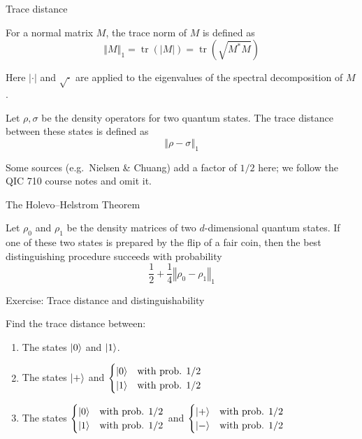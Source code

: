 \documentclass[10pt,aspectratio=169]{beamer}
\newcommand{\abs}[1]{\left| #1 \right|}
\newcommand{\norm}[1]{\left\Vert #1 \right\Vert}
\newcommand{\tr}{\operatorname{tr}}
\begin{document}
\begin{frame}{Trace distance}
  \begin{definition}
    For a normal matrix $M$, the trace norm of $M$ is defined as
    \[\norm{M}_1 = \tr\left(\abs{M}\right) = \tr\left(\sqrt{M^*M}\right)\]
  \end{definition}
  {\small Here $\abs{\cdot}$ and $\sqrt{\cdot}$ are applied to the eigenvalues
  of the spectral decomposition of $M$.\par}
  \vspace{0.5em}
  \pause
  \begin{definition}
    Let $\rho,\sigma$ be the density operators for two quantum states. The
    trace distance between these states is defined as
    \[\norm{\rho-\sigma}_1\]
  \end{definition}
  {\small Some sources (e.g.\ Nielsen \& Chuang) add a factor of $1/2$ here; we
  follow the QIC 710 course notes and omit it.\par}
\end{frame}

\begin{frame}{The Holevo--Helstrom Theorem}
  \begin{theorem}
    Let $\rho_0$ and $\rho_1$ be the density matrices of two $d$-dimensional
    quantum states. If one of these two states is prepared by the flip of a
    fair coin, then the best distinguishing procedure succeeds with probability
    \[\frac{1}{2} + \frac{1}{4}\norm{\rho_0 - \rho_1}_1\]
  \end{theorem}
\end{frame}

\begin{frame}{Exercise: Trace distance and distinguishability}
  \begin{exampleblock}{Find the trace distance between:}
    \begin{enumerate}[<+->]
      \item The states $\ket{0}$ and $\ket{1}$.
      \item The states $\ket{+}$ and
        $\begin{cases}\ket{0} & \text{with prob. }1/2 \\ \ket{1} & \text{with prob. }1/2\end{cases}$
      \item The states
        $\begin{cases}\ket{0} & \text{with prob. }1/2 \\ \ket{1} & \text{with prob. }1/2\end{cases}$
        and
        $\begin{cases}\ket{+} & \text{with prob. }1/2 \\ \ket{-} & \text{with prob. }1/2\end{cases}$
    \end{enumerate}
  \end{exampleblock}
\end{frame}
\end{document}
